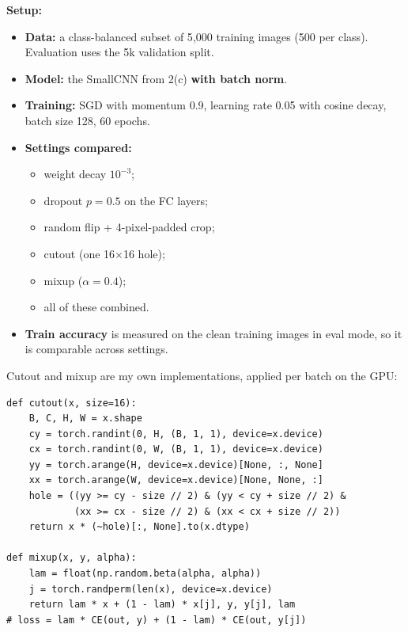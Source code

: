 \documentclass[11pt,a4paper]{article}
\begin{document}
\textbf{Setup:}
\begin{itemize}
  \item \textbf{Data:} a class-balanced subset of 5{,}000 training images (500 per class). Evaluation uses the 5k validation split.
  \item \textbf{Model:} the SmallCNN from 2(c) \textbf{with batch norm}.
  \item \textbf{Training:} SGD with momentum 0.9, learning rate 0.05 with cosine decay, batch size 128, 60 epochs.
  \item \textbf{Settings compared:}
  \begin{itemize}
    \item weight decay $10^{-3}$;
    \item dropout $p=0.5$ on the FC layers;
    \item random flip + 4-pixel-padded crop;
    \item cutout (one 16$\times$16 hole);
    \item mixup ($\alpha=0.4$);
    \item all of these combined.
  \end{itemize}
  \item \textbf{Train accuracy} is measured on the clean training images in eval mode, so it is comparable across settings.
\end{itemize}

Cutout and mixup are my own implementations, applied per batch on the GPU:
\begin{lstlisting}
def cutout(x, size=16):
    B, C, H, W = x.shape
    cy = torch.randint(0, H, (B, 1, 1), device=x.device)
    cx = torch.randint(0, W, (B, 1, 1), device=x.device)
    yy = torch.arange(H, device=x.device)[None, :, None]
    xx = torch.arange(W, device=x.device)[None, None, :]
    hole = ((yy >= cy - size // 2) & (yy < cy + size // 2) &
            (xx >= cx - size // 2) & (xx < cx + size // 2))
    return x * (~hole)[:, None].to(x.dtype)

def mixup(x, y, alpha):
    lam = float(np.random.beta(alpha, alpha))
    j = torch.randperm(len(x), device=x.device)
    return lam * x + (1 - lam) * x[j], y, y[j], lam
# loss = lam * CE(out, y) + (1 - lam) * CE(out, y[j])
\end{lstlisting}
\end{document}

